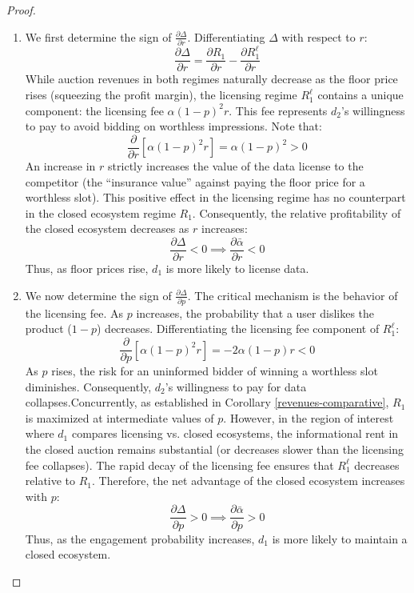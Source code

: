 \documentclass[11pt]{article}
\theoremstyle{plain}
\theoremstyle{definition}
\theoremstyle{plain}
\theoremstyle{plain}
\theoremstyle{plain}
\theoremstyle{plain}
\numberwithin{equation}{section}
\begin{document}
\begin{proof}
    \begin{enumerate}
        \item We first determine the sign of $\frac{\partial \Delta}{\partial r}$. Differentiating $\Delta$ with respect to $r$:
    \begin{equation*}
        \frac{\partial \Delta}{\partial r} = \frac{\partial R_1}{\partial r} - \frac{\partial R_1^\ell}{\partial r}
    \end{equation*}
    While auction revenues in both regimes naturally decrease as the floor price rises (squeezing the profit margin), the licensing regime $R_1^\ell$ contains a unique component: the licensing fee $\alpha(1-p)^2 r$. This fee represents $d_2$'s willingness to pay to avoid bidding on worthless impressions. Note that:
    \[
        \frac{\partial}{\partial r} \left[ \alpha(1-p)^2 r \right] = \alpha(1-p)^2 > 0
    \]
    An increase in $r$ strictly increases the value of the data license to the competitor (the ``insurance value'' against paying the floor price for a worthless slot). This positive effect in the licensing regime has no counterpart in the closed ecosystem regime $R_1$. Consequently, the relative profitability of the closed ecosystem decreases as $r$ increases:
    \[
        \frac{\partial \Delta}{\partial r} < 0 \implies \frac{\partial \bar{\alpha}}{\partial r} < 0
    \]
    Thus, as floor prices rise, $d_1$ is more likely to license data.
    \item We now determine the sign of $\frac{\partial \Delta}{\partial p}$. The critical mechanism is the behavior of the licensing fee. As $p$ increases, the probability that a user dislikes the product ($1-p$) decreases.
    Differentiating the licensing fee component of $R_1^\ell$:
    \begin{equation*}
        \frac{\partial}{\partial p} \left[ \alpha(1-p)^2 r \right] = -2\alpha(1-p)r < 0
    \end{equation*}
    As $p$ rises, the risk for an uninformed bidder of winning a worthless slot diminishes. Consequently, $d_2$'s willingness to pay for data collapses.Concurrently, as established in Corollary \ref{revenues-comparative}, $R_1$ is maximized at intermediate values of $p$. However, in the region of interest where $d_1$ compares licensing vs. closed ecosystems, the informational rent in the closed auction remains substantial (or decreases slower than the licensing fee collapses). The rapid decay of the licensing fee ensures that $R_1^\ell$ decreases relative to $R_1$. Therefore, the net advantage of the closed ecosystem increases with $p$:
    \[
        \frac{\partial \Delta}{\partial p} > 0 \implies \frac{\partial \bar{\alpha}}{\partial p} > 0
    \]
    Thus, as the engagement probability increases, $d_1$ is more likely to maintain a closed ecosystem.

    \end{enumerate}
\end{proof}
\end{document}
